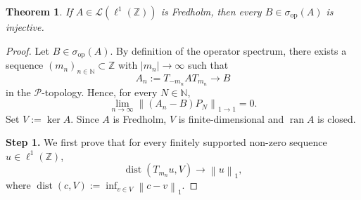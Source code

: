\documentclass[reqno,a4paper,12pt]{amsart}
\numberwithin{equation}{section}
\newtheorem{theorem}[definition]{Theorem}
\def\N{{\mathbb N}}
\def\Z{{\mathbb Z}}
\newcommand\1{\mathds{1}}
\newcommand{\norm}[1]{\left\lVert #1 \right\rVert}
\newcommand{\abs}[1]{\left\lvert #1 \right\rvert}
\newcommand{\dist}{\operatorname{dist}}
\begin{document}
\begin{theorem}\label{thm:selfsimilarinjective}
If $A \in \mathcal L(\ell^1(\Z))$ is Fredholm, then every
$B \in \sigma_{\mathrm{op}}(A)$ is injective.
\end{theorem}

\begin{proof}
Let $B\in\sigma_{\mathrm{op}}(A)$. By definition of the operator spectrum,
there exists a sequence $(m_n)_{n\in\mathbb N}\subset\Z$ with
$\abs{m_n}\to\infty$ such that
$$
A_n:=T_{-m_n}AT_{m_n}\to B
$$
in the $\mathcal P$-topology. Hence, for every $N\in\N$,
\begin{equation}\label{eq:p-topology-column}
\lim_{n\to\infty}\norm{(A_n-B)P_N}_{1\to1}=0.
\end{equation}
Set $V:=\ker A$. Since $A$ is Fredholm, $V$ is finite-dimensional and
$\operatorname{ran}A$ is closed.

\textbf{Step 1.}
We first prove that for every finitely supported non-zero sequence $u\in \ell^1(\Z)$,
\begin{equation}\label{eq:shifted-distance-limit}
\dist(T_{m_n}u,V)\to \norm{u}_1,
\end{equation}
where $\dist(c,V):=\inf_{v\in V}\norm{c-v}_1$.



\end{proof}
\end{document}
